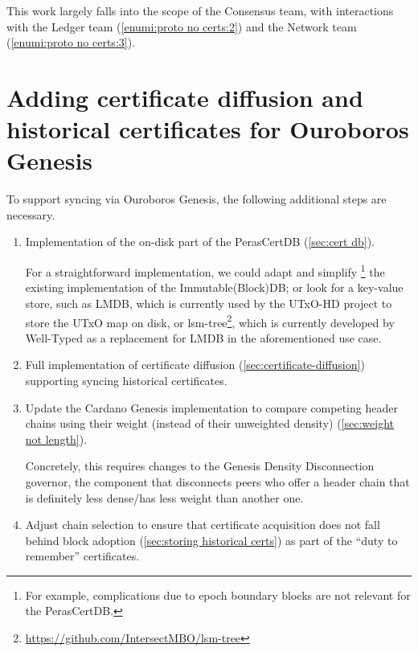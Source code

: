 This work largely falls into the scope of the Consensus team, with interactions with the Ledger team (\ref{enumi:proto no certs:2}) and the Network team (\ref{enumi:proto no certs:3}).

\section{Adding certificate diffusion and historical certificates for Ouroboros Genesis}\label{sec:implementation with genesis}

To support syncing via Ouroboros Genesis, the following additional steps are necessary.
\begin{enumerate}
\item
  Implementation of the on-disk part of the PerasCertDB (\cref{sec:cert db}).

  For a straightforward implementation, we could adapt and simplify \footnote{For example, complications due to epoch boundary blocks are not relevant for the PerasCertDB.} the existing implementation of the Immutable(Block)DB; or look for a key-value store, such as LMDB, which is currently used by the UTxO-HD project to store the UTxO map on disk, or lsm-tree\footnote{\url{https://github.com/IntersectMBO/lsm-tree}}, which is currently developed by Well-Typed as a replacement for LMDB in the aforementioned use case.
\item
  Full implementation of certificate diffusion (\cref{sec:certificate-diffusion}) supporting syncing historical certificates.
\item
  Update the Cardano Genesis implementation \parencite{genesis-implementation-documentation} to compare competing header chains using their weight (instead of their unweighted density) (\cref{sec:weight not length}).

  Concretely, this requires changes to the Genesis Density Disconnection governor, the component that disconnects peers who offer a header chain that is definitely less dense/has less weight than another one.
\item
  Adjust chain selection to ensure that certificate acquisition does not fall behind block adoption (\cref{sec:storing historical certs}) as part of the \enquote{duty to remember} certificates.
\end{enumerate}

